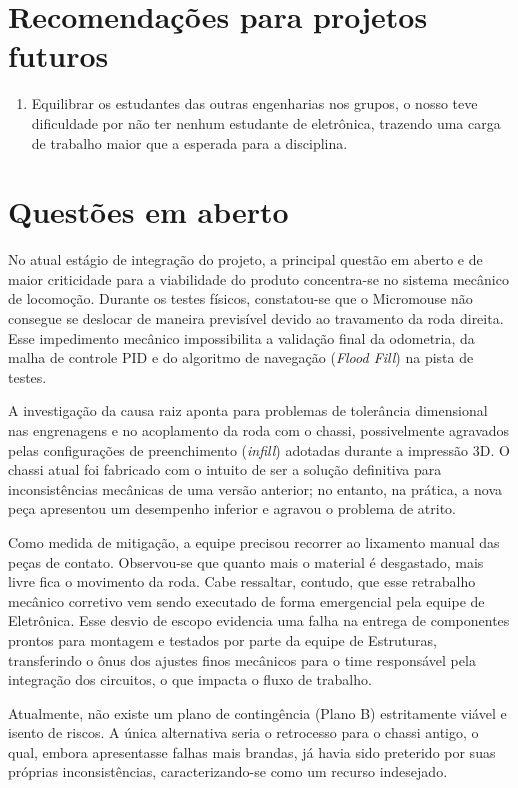 \section{Recomendações para projetos futuros}

\begin{enumerate}
	\item Equilibrar os estudantes das outras engenharias nos grupos, o nosso teve dificuldade por não ter nenhum estudante de eletrônica, trazendo uma carga de trabalho maior que a esperada para a disciplina.
\end{enumerate}

\section{Questões em aberto}
\label{sec:questoes_em_aberto}

No atual estágio de integração do projeto, a principal questão em aberto e de maior criticidade para a viabilidade do produto concentra-se no sistema mecânico de locomoção. Durante os testes físicos, constatou-se que o Micromouse não consegue se deslocar de maneira previsível devido ao travamento da roda direita. Esse impedimento mecânico impossibilita a validação final da odometria, da malha de controle PID e do algoritmo de navegação (\textit{Flood Fill}) na pista de testes.

A investigação da causa raiz aponta para problemas de tolerância dimensional nas engrenagens e no acoplamento da roda com o chassi, possivelmente agravados pelas configurações de preenchimento (\textit{infill}) adotadas durante a impressão 3D. O chassi atual foi fabricado com o intuito de ser a solução definitiva para inconsistências mecânicas de uma versão anterior; no entanto, na prática, a nova peça apresentou um desempenho inferior e agravou o problema de atrito.

Como medida de mitigação, a equipe precisou recorrer ao lixamento manual das peças de contato. Observou-se que quanto mais o material é desgastado, mais livre fica o movimento da roda. Cabe ressaltar, contudo, que esse retrabalho mecânico corretivo vem sendo executado de forma emergencial pela equipe de Eletrônica. Esse desvio de escopo evidencia uma falha na entrega de componentes prontos para montagem e testados por parte da equipe de Estruturas, transferindo o ônus dos ajustes finos mecânicos para o time responsável pela integração dos circuitos, o que impacta o fluxo de trabalho.

Atualmente, não existe um plano de contingência (Plano B) estritamente viável e isento de riscos. A única alternativa seria o retrocesso para o chassi antigo, o qual, embora apresentasse falhas mais brandas, já havia sido preterido por suas próprias inconsistências, caracterizando-se como um recurso indesejado.

